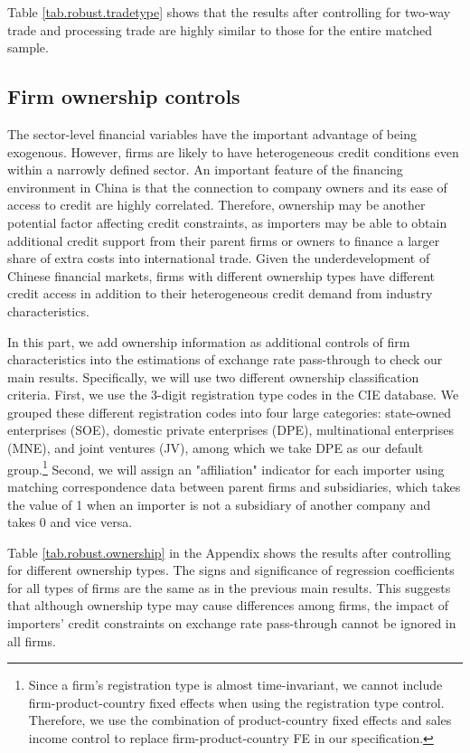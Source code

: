 \documentclass[12pt]{article}
\begin{document}
Table \ref{tab.robust.tradetype} shows that the results after controlling for two-way trade and processing trade are highly similar to those for the entire matched sample.

\subsection{Firm ownership controls}

The sector-level financial variables have the important advantage of being exogenous. However, firms are likely to have heterogeneous credit conditions even within a narrowly defined sector. An important feature of the financing environment in China is that the connection to company owners and its ease of access to credit are highly correlated. Therefore, ownership may be another potential factor affecting credit constraints, as importers may be able to obtain additional credit support from their parent firms or owners to finance a larger share of extra costs into international trade. Given the underdevelopment of Chinese financial markets, firms with different ownership types have different credit access in addition to their heterogeneous credit demand from industry characteristics. 

In this part, we add ownership information as additional controls of firm characteristics into the estimations of exchange rate pass-through to check our main results. Specifically, we will use two different ownership classification criteria. First, we use the 3-digit registration type codes in the CIE database. We grouped these different registration codes into four large categories: state-owned enterprises (SOE), domestic private enterprises (DPE), multinational enterprises (MNE), and joint ventures (JV), among which we take DPE as our default group.\footnote{Since a firm's registration type is almost time-invariant, we cannot include firm-product-country fixed effects when using the registration type control. Therefore, we use the combination of product-country fixed effects and sales income control to replace firm-product-country FE in our specification.} Second, we will assign an "affiliation" indicator for each importer using matching correspondence data between parent firms and subsidiaries, which takes the value of 1 when an importer is not a subsidiary of another company and takes 0 and vice versa.

Table \ref{tab.robust.ownership} in the Appendix shows the results after controlling for different ownership types. The signs and significance of regression coefficients for all types of firms are the same as in the previous main results. This suggests that although ownership type may cause differences among firms, the impact of importers' credit constraints on exchange rate pass-through cannot be ignored in all firms.
\end{document}
